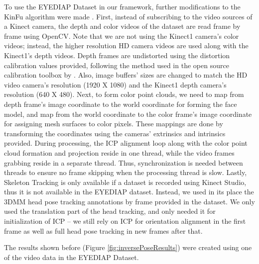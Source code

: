 \documentclass{ut-thesis}
\providecommand{\DIFaddtex}[1]{{\protect\color{blue}\uwave{#1}}} %
\providecommand{\DIFaddbegin}{} %
\providecommand{\DIFaddend}{} %
\providecommand{\DIFadd}[1]{\texorpdfstring{\DIFaddtex{#1}}{#1}} %
\begin{document}
To use the EYEDIAP Dataset in our framework, further modifications to the KinFu algorithm were made \DIFaddbegin \DIFadd{by the researcher}\DIFaddend .  First, instead of subscribing to the video sources of a Kinect camera, the depth and color videos of the dataset are read frame by frame using OpenCV.  Note that we are not using the Kinect1 camera's color videos; instead, the higher resolution HD camera videos are used along with the Kinect1's depth videos.  Depth frames are undistorted using the distortion calibration values provided, following the method used in the open source calibration toolbox by \cite{herrera2012joint}.  Also, image buffers' sizes are changed to match the HD video camera's resolution (1920 X 1080) and the Kinect1 depth camera's resolution (640 X 480).  Next, to form color point clouds, we need to map from depth frame's image coordinate to the world coordinate for forming the face model, and map from the world coordinate to the color frame's image coordinate for assigning mesh surfaces to color pixels.  These mappings are done by transforming the coordinates using the cameras' extrinsics and intrinsics provided.  During processing, the ICP alignment loop along with the color point cloud formation and projection reside in one thread, while the video frames grabbing reside in a separate thread.  Thus, synchronization is needed between threads to ensure no frame skipping when the processing thread is slow.  Lastly, Skeleton Tracking is only available if a dataset is recorded using Kinect Studio, thus it is not available in the EYEDIAP dataset.  Instead, we used in its place the 3DMM head pose tracking annotations by frame provided in the dataset.  We only used the translation part of the head tracking, and only needed it for initialization of ICP -- we still rely on ICP for orientation alignment in the first frame as well as full head pose tracking in new frames after that.

The results shown before (Figure \ref{fig:inversePoseResults}) were created using one of the video data in the EYEDIAP Dataset.




\end{document}
